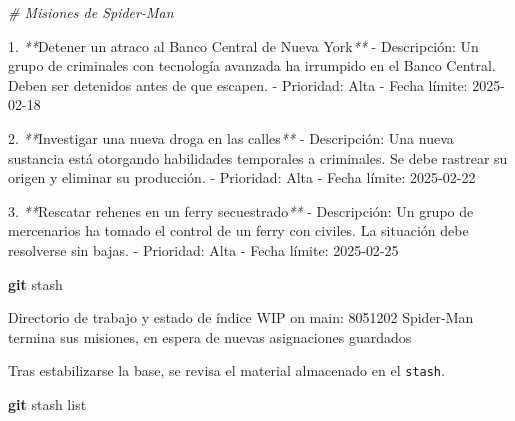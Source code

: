 \documentclass[
]{book}
\newenvironment{Shaded}{\begin{snugshade}}{\end{snugshade}}
\newcommand{\CommentTok}[1]{\textcolor[rgb]{0.56,0.35,0.01}{\textit{#1}}}
\newcommand{\ExtensionTok}[1]{#1}
\newcommand{\FunctionTok}[1]{\textcolor[rgb]{0.13,0.29,0.53}{\textbf{#1}}}
\newcommand{\NormalTok}[1]{#1}
\newcommand{\PreprocessorTok}[1]{\textcolor[rgb]{0.56,0.35,0.01}{\textit{#1}}}
\begin{document}
\begin{Shaded}
\begin{Highlighting}[]
\CommentTok{\# Misiones de Spider{-}Man}

\ExtensionTok{1.} \PreprocessorTok{**}\NormalTok{Detener un atraco al Banco Central de Nueva York}\PreprocessorTok{**}
   \ExtensionTok{{-}}\NormalTok{ Descripción: Un grupo de criminales con tecnología avanzada ha irrumpido en el Banco Central. Deben ser detenidos antes de que escapen.}
   \ExtensionTok{{-}}\NormalTok{ Prioridad: Alta}
   \ExtensionTok{{-}}\NormalTok{ Fecha límite: 2025{-}02{-}18}

\ExtensionTok{2.} \PreprocessorTok{**}\NormalTok{Investigar una nueva droga en las calles}\PreprocessorTok{**}
   \ExtensionTok{{-}}\NormalTok{ Descripción: Una nueva sustancia está otorgando habilidades temporales a criminales. Se debe rastrear su origen y eliminar su producción.}
   \ExtensionTok{{-}}\NormalTok{ Prioridad: Alta}
   \ExtensionTok{{-}}\NormalTok{ Fecha límite: 2025{-}02{-}22}

\ExtensionTok{3.} \PreprocessorTok{**}\NormalTok{Rescatar rehenes en un ferry secuestrado}\PreprocessorTok{**}
   \ExtensionTok{{-}}\NormalTok{ Descripción: Un grupo de mercenarios ha tomado el control de un ferry con civiles. La situación debe resolverse sin bajas.}
   \ExtensionTok{{-}}\NormalTok{ Prioridad: Alta}
   \ExtensionTok{{-}}\NormalTok{ Fecha límite: 2025{-}02{-}25}
\end{Highlighting}
\end{Shaded}

\begin{Shaded}
\begin{Highlighting}[]
\FunctionTok{git}\NormalTok{ stash}
\end{Highlighting}
\end{Shaded}

\begin{Shaded}
\begin{Highlighting}[]
\ExtensionTok{Directorio}\NormalTok{ de trabajo y estado de índice WIP on main: 8051202 Spider{-}Man termina sus misiones, en espera de nuevas asignaciones guardados}
\end{Highlighting}
\end{Shaded}

Tras estabilizarse la base, se revisa el material almacenado en el \texttt{stash}.

\begin{Shaded}
\begin{Highlighting}[]
\FunctionTok{git}\NormalTok{ stash list}
\end{Highlighting}
\end{Shaded}
\end{document}
